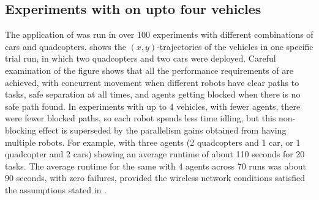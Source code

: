 \subsection{Experiments with \Task on upto four vehicles}
The \Task application of  was run in over 100 experiments with different combinations of cars and quadcopters.
 shows the $(x,y)$-trajectories of the vehicles in one specific trial run, in which two  quadcopters and two cars were deployed. 
Careful examination of the figure  shows that all the performance requirements of \Task are achieved, with concurrent movement when different robots have clear paths to tasks, safe separation at all times, and agents getting blocked when there is no safe path found. In experiments with up to $4$ vehicles, with fewer agents, there were fewer blocked paths, so each robot spends less time idling, but this non-blocking effect is superseded by the parallelism gains obtained from  having multiple robots. For example, with three agents (2 quadcopters and 1 car, or 1 quadcopter and 2 cars) showing an average runtime of about 110 seconds for 20 tasks.
  The average runtime for the same with 4 agents across 70 runs was about 90 seconds, with zero failures, provided the wireless network conditions satisfied the assumptions stated in .

